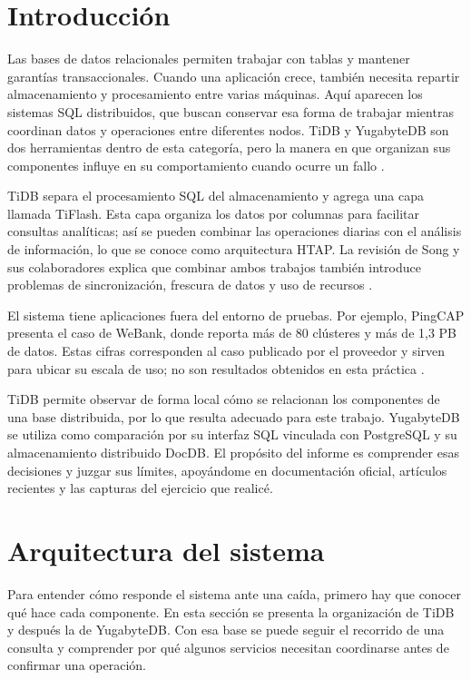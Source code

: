 \documentclass[11pt,a4paper]{article}
\begin{document}
\section{Introducción}
Las bases de datos relacionales permiten trabajar con tablas y mantener garantías transaccionales. Cuando una aplicación crece, también necesita repartir almacenamiento y procesamiento entre varias máquinas. Aquí aparecen los sistemas SQL distribuidos, que buscan conservar esa forma de trabajar mientras coordinan datos y operaciones entre diferentes nodos. TiDB y YugabyteDB son dos herramientas dentro de esta categoría, pero la manera en que organizan sus componentes influye en su comportamiento cuando ocurre un fallo \cite{tidb_arch,yb_arch}.

TiDB separa el procesamiento SQL del almacenamiento y agrega una capa llamada TiFlash. Esta capa organiza los datos por columnas para facilitar consultas analíticas; así se pueden combinar las operaciones diarias con el análisis de información, lo que se conoce como arquitectura HTAP. La revisión de Song y sus colaboradores explica que combinar ambos trabajos también introduce problemas de sincronización, frescura de datos y uso de recursos \cite{song2024survey}.

El sistema tiene aplicaciones fuera del entorno de pruebas. Por ejemplo, PingCAP presenta el caso de WeBank, donde reporta más de 80 clústeres y más de 1,3 PB de datos. Estas cifras corresponden al caso publicado por el proveedor y sirven para ubicar su escala de uso; no son resultados obtenidos en esta práctica \cite{tidb_webank}.

TiDB permite observar de forma local cómo se relacionan los componentes de una base distribuida, por lo que resulta adecuado para este trabajo. YugabyteDB se utiliza como comparación por su interfaz SQL vinculada con PostgreSQL y su almacenamiento distribuido DocDB. El propósito del informe es comprender esas decisiones y juzgar sus límites, apoyándome en documentación oficial, artículos recientes y las capturas del ejercicio que realicé.

\section{Arquitectura del sistema}
Para entender cómo responde el sistema ante una caída, primero hay que conocer qué hace cada componente. En esta sección se presenta la organización de TiDB y después la de YugabyteDB. Con esa base se puede seguir el recorrido de una consulta y comprender por qué algunos servicios necesitan coordinarse antes de confirmar una operación.
\end{document}
